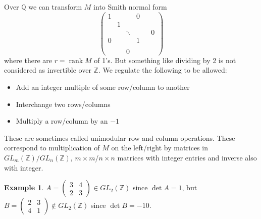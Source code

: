 \documentclass[a4paper]{article}
\newcommand{\rank}{\operatorname{rank}}
\theoremstyle{definition}
\newtheorem{example}[defn]{Example}
\begin{document}
Over $\mathbb Q$ we can transform $ M$ into Smith normal form
\[
\begin{pmatrix}
1 & & & 0\\
& 1 \\
& & \ddots & & & 0 \\
0 & & & 1 \\ \\
& & 0
\end{pmatrix}
\]
where there are $r=\rank M$ of 1's. But something like dividing by 2 is not considered as invertible over $\mathbb Z$. We regulate the following to be allowed:
\begin{itemize}
    \item Add an integer multiple of some row/column to another
    \item Interchange two rows/columns
    \item Multiply a row/column by an $-1$
\end{itemize}
These are sometimes called unimodular row and column operations. These correspond to multiplication of $M$ on the left/right by matrices in $GL_m (\mathbb Z)/GL_n (\mathbb Z)$, $m\times m$/$n\times n$ matrices with integer entries and inverse also with integer.
\begin{example}
$A=\begin{pmatrix}
3 & 4 \\ 2 & 3
\end{pmatrix}\in GL_2 (\mathbb Z)$ since $\det A=1$, but $B=\begin{pmatrix}
    2 & 3 \\ 4 & 1
\end{pmatrix}\notin GL_2 (\mathbb Z)$ since $\det B=-10$.
\end{example}
\end{document}
